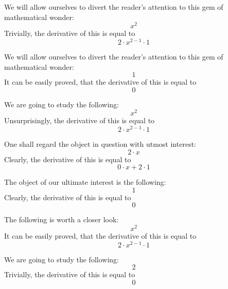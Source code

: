 \documentclass{article}
\begin{document}
We will allow ourselves to divert the reader's attention to this gem of mathematical wonder:
\begin{equation}
x ^{2 } 
\end{equation}
Trivially, the derivative of this is equal to
\begin{equation}
2 \cdot x ^{2 - 1 } \cdot 1 
\end{equation}

We will allow ourselves to divert the reader's attention to this gem of mathematical wonder:
\begin{equation}
1 
\end{equation}
It can be easily proved, that the derivative of this is equal to
\begin{equation}
0 
\end{equation}

We are going to study the following:
\begin{equation}
x ^{2 } 
\end{equation}
Unsurprisingly, the derivative of this is equal to
\begin{equation}
2 \cdot x ^{2 - 1 } \cdot 1 
\end{equation}

One shall regard the object in question with utmost interest:
\begin{equation}
2 \cdot x 
\end{equation}
Clearly, the derivative of this is equal to
\begin{equation}
0 \cdot x + 2 \cdot 1 
\end{equation}

The object of our ultimate interest is the following:
\begin{equation}
1 
\end{equation}
Clearly, the derivative of this is equal to
\begin{equation}
0 
\end{equation}

The following is worth a closer look:
\begin{equation}
x ^{2 } 
\end{equation}
It can be easily proved, that the derivative of this is equal to
\begin{equation}
2 \cdot x ^{2 - 1 } \cdot 1 
\end{equation}

We are going to study the following:
\begin{equation}
2 
\end{equation}
Trivially, the derivative of this is equal to
\begin{equation}
0 
\end{equation}
\end{document}
